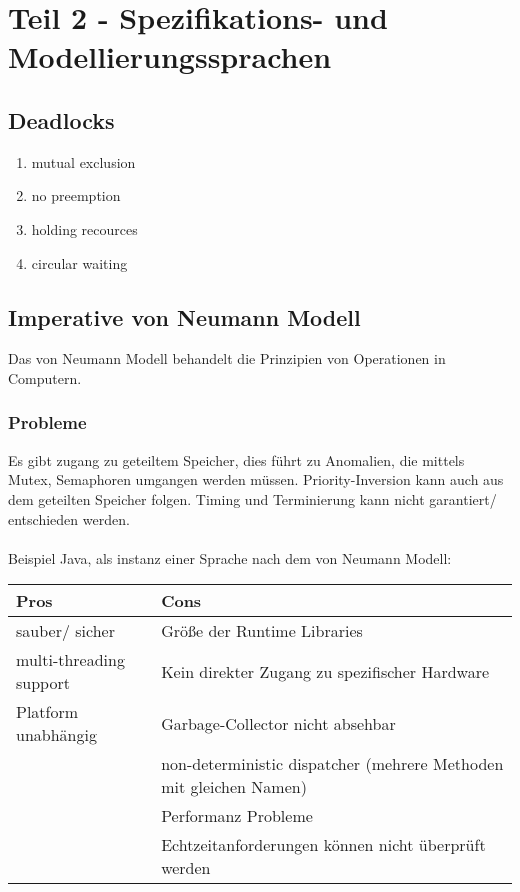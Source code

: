 \section{Teil 2 - Spezifikations- und Modellierungssprachen}

\subsection{Deadlocks}

\begin{enumerate}
    \item mutual exclusion
    \item no preemption
    \item holding recources
    \item circular waiting
\end{enumerate}



\subsection{Imperative von Neumann Modell}

Das von Neumann Modell behandelt die Prinzipien von Operationen in Computern.

\subsubsection{Probleme}

Es gibt zugang zu geteiltem Speicher, dies führt zu Anomalien, die mittels Mutex, Semaphoren umgangen werden müssen.
Priority-Inversion kann auch aus dem geteilten Speicher folgen.
Timing und Terminierung kann nicht garantiert/ entschieden werden.
\\ \\
Beispiel Java, als instanz einer Sprache nach dem von Neumann Modell:\\
\begin{tabular}{|p{8cm}|p{8cm}|}
    \hline
    Pros                                            & Cons\\ \hline\hline
    sauber/ sicher                                  & Größe der Runtime Libraries\\ \hline
    multi-threading support                         & Kein direkter Zugang zu spezifischer Hardware\\ \hline
    Platform unabhängig                             & Garbage-Collector nicht absehbar\\ \hline
                                                    & non-deterministic dispatcher (mehrere Methoden mit gleichen Namen)\\ \hline
                                                    & Performanz Probleme\\ \hline
                                                    & Echtzeitanforderungen können nicht überprüft werden\\ \hline
\end{tabular}



